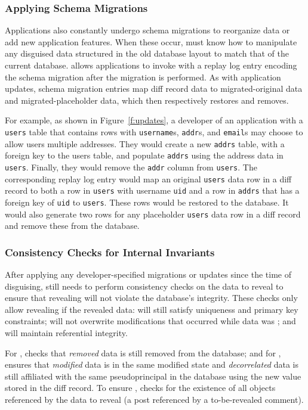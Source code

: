 \subsubsection{Applying Schema Migrations}
Applications also constantly undergo schema migrations to reorganize data or add
new application features. When these occur, \sys must know how to manipulate any
disguised data structured in the old database layout to match that of the
current database.
%
\sys allows applications to invoke \sys with a replay log entry encoding the
schema migration after the migration is performed.
%
As with application updates, schema migration entries map diff record data to
migrated-original data and migrated-placeholder data, which \sys then
respectively restores and removes.

For example, as shown in Figure~\ref{f:updates}, a developer of an application
with a \texttt{users} table that contains rows with \texttt{username}s,
\texttt{addr}s, and \texttt{email}s may choose to allow users multiple
addresses.  They would create a new \texttt{addrs} table, with a foreign key to
the users table, and populate \texttt{addrs} using the address data in
\texttt{users}.  Finally, they would remove the \texttt{addr} column from
\texttt{users}.
%
The corresponding replay log entry would map an original \texttt{users} data row
in a diff record to both a row in \texttt{users} with username \texttt{uid} and
a row in \texttt{addrs} that has a foreign key of \texttt{uid} to
\texttt{users}. These rows would be restored to the database.
%
It would also generate two rows for any placeholder \texttt{users} data row in a
diff record and remove these from the database.
%

\subsubsection{Consistency Checks for Internal Invariants} 
After applying any developer-specified migrations or updates since the time of
disguising, \sys still needs to perform consistency checks on the data to reveal
to ensure that revealing will not violate the database's integrity.
%
These checks only allow revealing if the revealed data: \one{} will still
satisfy uniqueness and primary key constraints; \two{} will not overwrite
modifications that occurred while data was \xxed; and \three{} will maintain
referential integrity.

For \one{}, \sys checks that \emph{removed} \xxed data is still removed from the
database;
%
and for \two{}, \sys ensures that \emph{modified} \xxed data is in the same
modified state and \emph{decorrelated} \xxed data is still affiliated with the
same pseudoprincipal in the database using the new value stored in the diff
record.
%
To ensure \three{}, \sys checks for the existence of all objects referenced by
the data to reveal (\eg a post referenced by a to-be-revealed comment).

